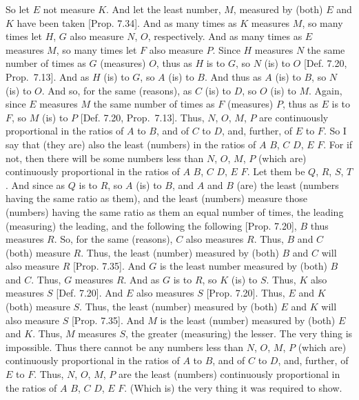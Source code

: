 \begin{Parallel}{}{}
{\epsfysize=2.5in
\centerline{}

So let $E$ not measure $K$. And let the least number, $M$, measured by 
(both) $E$ and $K$ have been taken [Prop. 7.34]. And as
many times as $K$ measures $M$, so many times let  $H$, $G$
also measure  $N$, $O$, respectively.  And as many times as $E$ measures $M$,
so many times let $F$ also measure $P$. Since $H$ measures $N$ the same
number of times as $G$
(measures) $O$, thus as $H$ is to $G$, so
$N$ (is) to $O$ [Def. 7.20, Prop.~7.13]. And as $H$ (is) to $G$, so $A$ (is)
to $B$. And thus as $A$ (is) to $B$, so $N$ (is) to $O$. And so, for the
same (reasons),  as $C$ (is) to $D$, so $O$ (is) to $M$. Again, since
$E$ measures $M$ the same number of times as $F$ (measures) $P$,
thus as $E$ is to $F$, so $M$ (is) to $P$ [Def. 7.20, Prop.~7.13]. Thus, $N$, $O$, $M$, $P$ are continuously proportional in the ratios of $A$ to $B$, and of $C$ to $D$, and,
further, of $E$ to $F$. So I say that (they are) also the least (numbers)
in the ratios of $A$ $B$, $C$ $D$, $E$ $F$.
For if not, then there will be some numbers less than $N$, $O$, $M$, $P$
(which are) continuously proportional in the ratios of $A$ $B$, $C$ $D$,
$E$ $F$. Let them be $Q$, $R$, $S$, $T$.
And since as $Q$ is to $R$, so $A$ (is) to $B$, and $A$ and $B$ (are) the
least (numbers having the same ratio as them), and the least (numbers) measure those
(numbers) having the same ratio as them an equal number of times, the leading (measuring) the leading, and the following the following [Prop. 7.20], $B$ thus measures $R$. So, for the
same (reasons), $C$ also measures $R$.  Thus, $B$ and $C$ (both)
measure $R$. Thus, the least (number) measured by (both) $B$ and $C$ will
also measure $R$ [Prop. 7.35]. And $G$ is the
least number measured by (both) $B$ and $C$. Thus, $G$ measures $R$.
And as $G$ is to $R$, so $K$ (is) to $S$. Thus, $K$ also measures $S$
[Def. 7.20]. And $E$ also measures $S$ [Prop. 7.20]. Thus, $E$ and $K$ (both) measure
$S$. Thus, the least (number) measured by (both) $E$ and $K$ will also
measure $S$   [Prop. 7.35]. And $M$  is the least (number) measured by (both)
$E$ and $K$. Thus, $M$ measures $S$, the greater (measuring) the lesser. The very thing is impossible.
Thus there cannot be any numbers less than $N$, $O$, $M$, $P$ (which
are) continuously proportional in the ratios of $A$ to $B$, and of
$C$ to $D$, and, further, of $E$ to $F$. Thus, $N$, $O$, $M$, $P$
are the least (numbers) continuously proportional in the ratios
of $A$ $B$, $C$ $D$, $E$ $F$. (Which is) the very thing it
was required to show.}
\end{Parallel}

